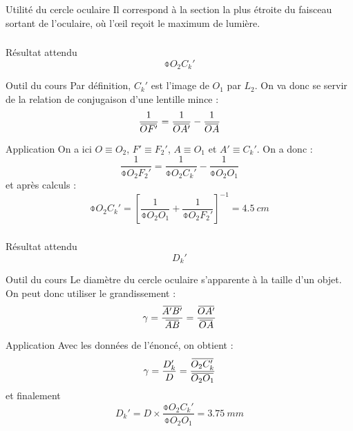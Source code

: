 \documentclass[10pt,a5paper,notitlepage]{book}
\begin{document}
\begin{inte}{Utilité du cercle oculaire}
    Il correspond à la section la plus étroite du faisceau sortant de
    l'oculaire, où l'œil reçoit le maximum de lumière.  
\end{inte}

\subsubsection{}
\begin{NCprop}{Résultat attendu}
    $$\obar{O_2C_k'}$$
\end{NCprop}

\begin{NCdemo}{Outil du cours}
    Par définition, $C_k'$ est l'image de $O_1$ par $L_2$. On va donc se servir
    de la relation de conjugaison d'une lentille mince :
    \[ \frac{1}{\OF} = \frac{1}{\OAp} - \frac{1}{\OA} \]
\end{NCdemo}

\begin{NCexem}{Application}
    On a ici $O \equiv O_2$, $F' \equiv F_2'$, $A \equiv O_1$ et $A' \equiv
    C_k'$. On a donc :
    \[ \frac{1}{\obar{O_2F_2'}} = \frac{1}{\obar{O_2C_k'}} -
    \frac{1}{\obar{O_2O_1}} \]
    et après calculs :
    \[ \boxed{\obar{O_2C_k'} = \left[ \frac{1}{\obar{O_2O_1}} +
    \frac{1}{\obar{O_2F_2'}}\right]^{-1} = \SI{+4.5}{cm}} \]
\end{NCexem}

\subsubsection{}
\begin{NCprop}{Résultat attendu}
    $$D_k'$$
\end{NCprop}

\begin{NCdemo}{Outil du cours}
    Le diamètre du cercle oculaire s'apparente à la taille d'un objet. On peut
    donc utiliser le grandissement :
    \[ \g = \frac{\ABp}{\ABb} = \frac{\OAp}{\OA} \]
\end{NCdemo}

\begin{NCexem}{Application}
    Avec les données de l'énoncé, on obtient :
    \[ \g = \frac{D_k'}{D} = \frac{\obar{O_2C_k'}}{\obar{O_2O_1}}\]
    et finalement
    \[ \boxed{D_k' = D\times \frac{\obar{O_2C_k'}}{\obar{O_2O_1}} =
    \SI{3.75}{mm}} \]
\end{NCexem}
\end{document}
